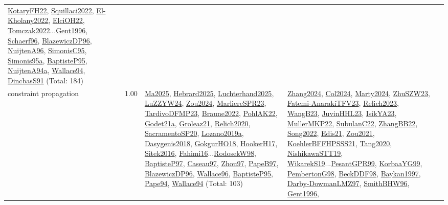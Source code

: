 {\begin{longtable}{p{3cm}r>{\raggedright\arraybackslash}p{6cm}>{\raggedright\arraybackslash}p{6cm}>{\raggedright\arraybackslash}p{8cm}}
\hyperref[detail:KotaryFH22]{KotaryFH22}, \hyperref[detail:Squillaci2022]{Squillaci2022}, \hyperref[detail:El-Kholany2022]{El-Kholany2022}, \hyperref[detail:ElciOH22]{ElciOH22}, \hyperref[detail:Tomczak2022]{Tomczak2022}...\hyperref[detail:Gent1996]{Gent1996}, \hyperref[detail:Schaerf96]{Schaerf96}, \hyperref[detail:BlazewiczDP96]{BlazewiczDP96}, \hyperref[detail:NuijtenA96]{NuijtenA96}, \hyperref[detail:SimonisC95]{SimonisC95}, \hyperref[detail:Simonis95a]{Simonis95a}, \hyperref[detail:BaptisteP95]{BaptisteP95}, \hyperref[detail:NuijtenA94a]{NuijtenA94a}, \hyperref[detail:Wallace94]{Wallace94}, \hyperref[detail:DincbasS91]{DincbasS91} (Total: 184)\\
\index{constraint propagation}\index{CP!constraint propagation}constraint propagation &  1.00 & \hyperref[detail:Ma2025]{Ma2025}, \hyperref[detail:Hebrard2025]{Hebrard2025}, \hyperref[detail:Luchterhand2025]{Luchterhand2025}, \hyperref[detail:LuZZYW24]{LuZZYW24}, \hyperref[detail:Zou2024]{Zou2024}, \hyperref[detail:MarliereSPR23]{MarliereSPR23}, \hyperref[detail:TardivoDFMP23]{TardivoDFMP23}, \hyperref[detail:Braune2022]{Braune2022}, \hyperref[detail:PohlAK22]{PohlAK22}, \hyperref[detail:Godet21a]{Godet21a}, \hyperref[detail:Groleaz21]{Groleaz21}, \hyperref[detail:Relich2020]{Relich2020}, \hyperref[detail:SacramentoSP20]{SacramentoSP20}, \hyperref[detail:Lozano2019a]{Lozano2019a}, \hyperref[detail:Dasygenis2018]{Dasygenis2018}, \hyperref[detail:GokgurHO18]{GokgurHO18}, \hyperref[detail:HookerH17]{HookerH17}, \hyperref[detail:Sitek2016]{Sitek2016}, \hyperref[detail:Fahimi16]{Fahimi16}...\hyperref[detail:RodosekW98]{RodosekW98}, \hyperref[detail:BaptisteP97]{BaptisteP97}, \hyperref[detail:Caseau97]{Caseau97}, \hyperref[detail:Zhou97]{Zhou97}, \hyperref[detail:PapeB97]{PapeB97}, \hyperref[detail:BlazewiczDP96]{BlazewiczDP96}, \hyperref[detail:Wallace96]{Wallace96}, \hyperref[detail:BaptisteP95]{BaptisteP95}, \hyperref[detail:Pape94]{Pape94}, \hyperref[detail:Wallace94]{Wallace94} (Total: 103) & \hyperref[detail:Zhang2024]{Zhang2024}, \hyperref[detail:Col2024]{Col2024}, \hyperref[detail:Marty2024]{Marty2024}, \hyperref[detail:ZhuSZW23]{ZhuSZW23}, \hyperref[detail:Fatemi-AnarakiTFV23]{Fatemi-AnarakiTFV23}, \hyperref[detail:Relich2023]{Relich2023}, \hyperref[detail:WangB23]{WangB23}, \hyperref[detail:JuvinHHL23]{JuvinHHL23}, \hyperref[detail:IsikYA23]{IsikYA23}, \hyperref[detail:MullerMKP22]{MullerMKP22}, \hyperref[detail:SubulanC22]{SubulanC22}, \hyperref[detail:ZhangBB22]{ZhangBB22}, \hyperref[detail:Song2022]{Song2022}, \hyperref[detail:Edis21]{Edis21}, \hyperref[detail:Zou2021]{Zou2021}, \hyperref[detail:KoehlerBFFHPSSS21]{KoehlerBFFHPSSS21}, \hyperref[detail:Tang2020]{Tang2020}, \hyperref[detail:NishikawaSTT19]{NishikawaSTT19}, \hyperref[detail:WikarekS19]{WikarekS19}...\hyperref[detail:PesantGPR99]{PesantGPR99}, \hyperref[detail:KorbaaYG99]{KorbaaYG99}, \hyperref[detail:PembertonG98]{PembertonG98}, \hyperref[detail:BeckDDF98]{BeckDDF98}, \hyperref[detail:Baykan1997]{Baykan1997}, \hyperref[detail:Darby-DowmanLMZ97]{Darby-DowmanLMZ97}, \hyperref[detail:SmithBHW96]{SmithBHW96}, \hyperref[detail:Gent1996]{Gent1996}, 
\end{longtable}}
